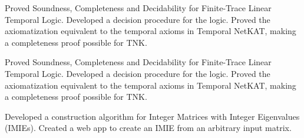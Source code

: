 \documentclass[]{deedy-resume-openfont}
\begin{document}
\begin{minipage}[t]{0.66\textwidth}




Proved Soundness, Completeness and Decidability for Finite-Trace Linear Temporal Logic. Developed a decision procedure for the logic. Proved the axiomatization equivalent to the temporal axioms in Temporal NetKAT, making a completeness proof possible for TNK.
\sectionsep







Proved Soundness, Completeness and Decidability for Finite-Trace Linear Temporal Logic. Developed a decision procedure for the logic. Proved the axiomatization equivalent to the temporal axioms in Temporal NetKAT, making a completeness proof possible for TNK.
\sectionsep







Developed a construction algorithm for Integer Matrices with Integer Eigenvalues (IMIEs). Created a web app to create an IMIE from an arbitrary input matrix.
\sectionsep









\end{minipage}
\end{document}
